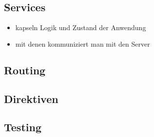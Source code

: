 \subsection{Services}
\begin{itemize}
  \item kapseln Logik und Zustand der Anwendung
  \item mit denen kommuniziert man mit den Server
\end{itemize}


\subsection{Routing}

\subsection{Direktiven}


\subsection{Testing}


